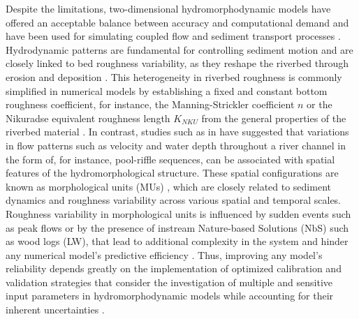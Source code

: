 \documentclass[draft,linenumbers,onecolumn]{agujournal2019} %
\begin{document}
Despite the limitations, two-dimensional hydromorphodynamic models have offered an acceptable balance between accuracy and computational demand and have been used for simulating coupled flow and sediment transport processes \cite{papanicolaou2008sediment}. Hydrodynamic patterns are fundamental for controlling sediment motion and are closely linked to bed roughness variability, as they reshape the riverbed through erosion and deposition \cite{lokin2023effect,mishra2020alluvial}. This heterogeneity in riverbed roughness is commonly simplified in numerical models by establishing a fixed and constant bottom roughness coefficient, for instance, the Manning-Strickler coefficient \( n \) or the Nikuradse equivalent roughness length \( K_{NKU} \) from the general properties of the riverbed material \cite{chow1959openchannel}. In contrast, studies such as in  have suggested that variations in flow patterns such as velocity and water depth throughout a river channel in the form of, for instance, pool-riffle sequences, can be associated with spatial features of the hydromorphological structure. These spatial configurations are known as morphological units (MUs) \cite{wadeson1994geomorphological,wyrick2014geospatial}, which are closely related to sediment dynamics and roughness variability across various spatial and temporal scales. Roughness variability in morphological units is influenced by sudden events such as peak flows or by the presence of instream Nature-based Solutions (NbS) such as wood logs (LW), that lead to additional complexity in the system and hinder any numerical model's predictive efficiency \cite{bunte2001samplinga,schalko2024flow}. Thus, improving any model's reliability depends greatly on the implementation of optimized calibration and validation strategies that consider the investigation of multiple and sensitive input parameters in hydromorphodynamic models while accounting for their inherent uncertainties \cite{guerrero2012calibration,li2011twodimensional,bel2020calibration,scolari2025hydromorphodynamic}.
\end{document}
